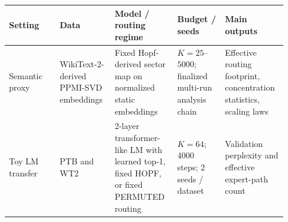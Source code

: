\begin{tabular}{p{0.17\linewidth}p{0.18\linewidth}p{0.21\linewidth}p{0.16\linewidth}p{0.20\linewidth}}
\toprule
Setting & Data & Model / routing regime & Budget / seeds & Main outputs \\
\midrule
Semantic proxy & WikiText-2-derived PPMI-SVD embeddings & Fixed Hopf-derived sector map on normalized static embeddings & $K=25$--$5000$; finalized multi-run analysis chain & Effective routing footprint, concentration statistics, scaling laws \\
Toy LM transfer & PTB and WT2 & 2-layer transformer-like LM with learned top-1, fixed HOPF, or fixed PERMUTED routing & $K=64$; 4000 steps; 2 seeds / dataset & Validation perplexity and effective expert-path count \\
\bottomrule
\end{tabular}
